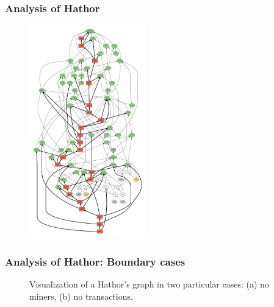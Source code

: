 \documentclass{beamer}
\begin{document}
\begin{frame}
\frametitle{Analysis of Hathor}

\begin{figure}
\centering\includegraphics[width=0.45\textwidth]{./images01/sim/hathor-2.pdf}
\end{figure}

\end{frame}


\begin{frame}
\frametitle{Analysis of Hathor: Boundary cases}

\begin{figure}
\centering
{}
\caption{Visualization of a Hathor's graph in two particular cases: (a) no miners, (b) no transactions.}
\end{figure}

\end{frame}
\end{document}
